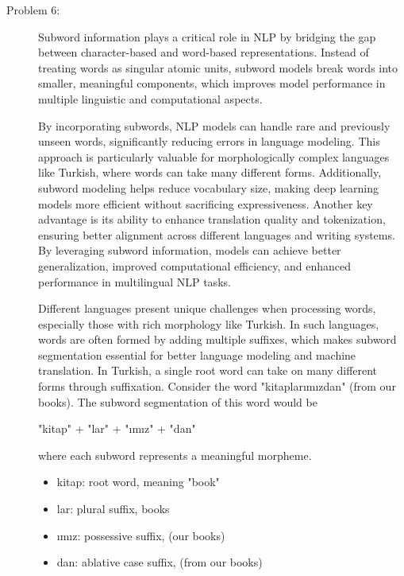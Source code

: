 \documentclass[10pt]{article}
\begin{document}
\begin{description}
\pagebreak

\item[Problem 6:]  \hfill %

Subword information plays a critical role in NLP by bridging the gap between character-based and word-based representations.
Instead of treating words as singular atomic units, subword models break words into smaller, meaningful components, 
which improves model performance in multiple linguistic and computational aspects.

By incorporating subwords, NLP models can handle rare and previously unseen words, significantly reducing errors in language modeling. 
This approach is particularly valuable for morphologically complex languages like Turkish, where words can take many different forms. 
Additionally, subword modeling helps reduce vocabulary size, making deep learning models more efficient without sacrificing expressiveness.
Another key advantage is its ability to enhance translation quality and tokenization, ensuring better alignment across different languages and writing systems. 
By leveraging subword information, models can achieve better generalization, improved computational efficiency, and enhanced performance in multilingual NLP tasks.

Different languages present unique challenges when processing words, especially those with rich morphology like Turkish. 
In such languages, words are often formed by adding multiple suffixes, which makes subword segmentation essential for better language modeling and machine translation.
In Turkish, a single root word can take on many different forms through suffixation. Consider the word "kitaplarımızdan" (from our books). 
The subword segmentation of this word would be 

\begin{center}
"kitap" + "lar" + "ımız" + "dan"
\end{center}

where each subword represents a meaningful morpheme.

\begin{itemize}
    \item kitap: root word, meaning "book"
    \item lar: plural suffix, books
    \item ımız: possessive suffix, (our books)
    \item dan: ablative case suffix, (from our books) 
\end{itemize}


\end{description}
\end{document}
